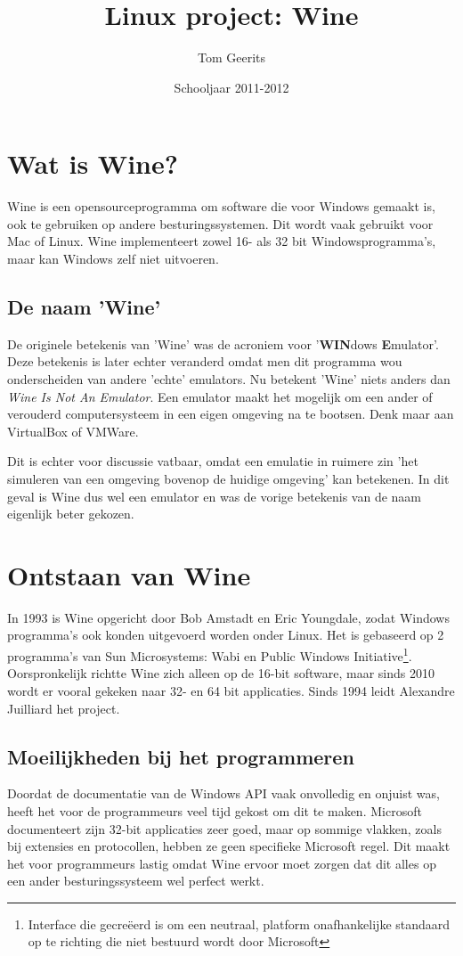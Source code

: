 \documentclass[12pt]{article}
\begin{document}
\title{Linux project: Wine}
\author{Tom Geerits}
\date{Schooljaar 2011-2012}
\maketitle
\newpage
\tableofcontents
\newpage
\listoffigures
\listoftables
\newpage
\section{Wat is Wine?}
Wine is een opensourceprogramma om software die voor Windows gemaakt is, ook te gebruiken op andere besturingssystemen. Dit wordt vaak gebruikt voor Mac of Linux. Wine implementeert zowel 16- als 32 bit Windowsprogramma's, maar kan Windows zelf niet uitvoeren.
\subsection{De naam 'Wine'}
De originele betekenis van 'Wine' was de acroniem voor '\textbf{WIN}dows \textbf{E}mulator'. \\
Deze betekenis is later echter veranderd omdat men dit programma wou onderscheiden van andere 'echte' emulators. Nu betekent 'Wine' niets anders dan \textit{Wine Is Not An Emulator}.
Een emulator maakt het mogelijk om een ander of verouderd computersysteem in een eigen omgeving na te bootsen. Denk maar aan VirtualBox of VMWare.

Dit is echter voor discussie vatbaar, omdat een emulatie in ruimere zin 'het simuleren van een omgeving bovenop de huidige omgeving' kan betekenen. In dit geval is Wine dus wel een emulator en was de vorige betekenis van de naam eigenlijk beter gekozen.
\newpage
\section{Ontstaan van Wine}
In 1993 is Wine opgericht door Bob Amstadt en Eric Youngdale, zodat Windows programma's ook konden uitgevoerd worden onder Linux. Het is gebaseerd op 2 programma's van Sun Microsystems: Wabi en Public Windows Initiative\footnote{Interface die gecreëerd is om een neutraal, platform onafhankelijke standaard op te richting die niet bestuurd wordt door Microsoft}. Oorspronkelijk richtte Wine zich alleen op de 16-bit software, maar sinds 2010 wordt er vooral gekeken naar 32- en 64 bit applicaties. Sinds 1994 leidt Alexandre Juilliard het project.
\subsection{Moeilijkheden bij het programmeren}
Doordat de documentatie van de Windows API vaak onvolledig en onjuist was, heeft het voor de programmeurs veel tijd gekost om dit te maken. Microsoft documenteert zijn 32-bit applicaties zeer goed, maar op sommige vlakken, zoals bij extensies en protocollen, hebben ze geen specifieke Microsoft regel. Dit maakt het voor programmeurs lastig omdat Wine ervoor moet zorgen dat dit alles op een ander besturingssysteem wel perfect werkt.
\end{document}

